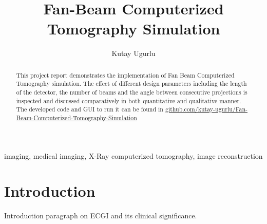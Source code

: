 \documentclass[journal]{IEEEtran}
\title{Fan-Beam Computerized Tomography Simulation}
\author{Kutay Ugurlu}
\begin{document}

\maketitle

\begin{abstract}This project report demonstrates the implementation of Fan Beam Computerized Tomography simulation. The effect of different design parameters including the length of the detector, the number of beams and the angle between consecutive projections is inspected and discussed comparatively in both quantitative and qualitative manner. The developed code and GUI to run it can be found in \href{https://github.com/kutay-ugurlu/Fan-Beam-Computerized-Tomography-Simulation}{github.com/kutay-ugurlu/Fan-Beam-Computerized-Tomography-Simulation} \\
\end{abstract}
\begin{IEEEkeywords}
	imaging, medical imaging, X-Ray computerized tomography, image reconstruction
\end{IEEEkeywords}

\section{Introduction}

Introduction paragraph on ECGI and its clinical significance.  \\

\end{document}
